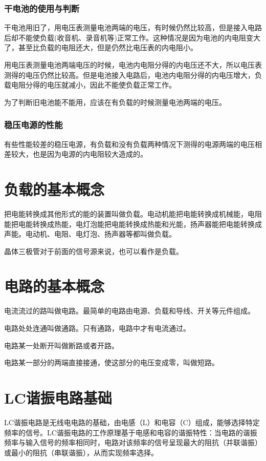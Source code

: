 \documentclass[12pt,UTF8]{ctexbook}
\begin{document}
\subsubsection{干电池的使用与判断}

干电池用旧了，用电压表测量电池两端的电压，有时候仍然比较高，但是接入电路后却不能使负载(收音机、录音机等)正常工作。这种情况是因为电池的内电阻变大了，甚至比负载的电阻还大，但是仍然比电压表的内电阻小。

用电压表测量电池两端电压的时候，电池内电阻分得的内电压还不大，所以电压表测得的电压仍然比较高。但是电池接入电路后，电池内电阻分得的内电压增大，负载电阻分得的电压就减小，因此不能使负载正常工作。

为了判断旧电池能不能用，应该在有负载的时候测量电池两端的电压。

\subsubsection{稳压电源的性能}

有些性能较差的稳压电源，有负载和没有负载两种情况下测得的电源两端的电压相差较大，也是因为电源的内电阻较大造成的。

\section{负载的基本概念}

把电能转换成其他形式的能的装置叫做负载。电动机能把电能转换成机械能，电阻能把电能转换成热能，电灯泡能把电能转换成热能和光能，扬声器能把电能转换成声能。电动机、电阻、电灯泡、扬声器等都叫做负载。

晶体三极管对于前面的信号源来说，也可以看作是负载。

\section{电路的基本概念}

电流流过的路叫做电路。最简单的电路由电源、负载和导线、开关等元件组成。

电路处处连通叫做通路。只有通路，电路中才有电流通过。

电路某一处断开叫做断路或者开路。

电路某一部分的两端直接接通，使这部分的电压变成零，叫做短路。

\section{LC谐振电路基础}

LC谐振电路是无线电电路的基础，由电感（L）和电容（C）组成，能够选择特定频率的信号。LC谐振电路的工作原理基于电感和电容的谐振特性：当电路的谐振频率与输入信号的频率相同时，电路对该频率的信号呈现最大的阻抗（并联谐振）或最小的阻抗（串联谐振），从而实现频率选择。
\end{document}
